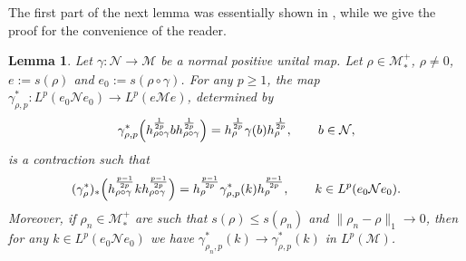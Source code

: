 \documentclass[12pt]{article}
\newtheorem{lemma}[theorem]{Lemma}
\theoremstyle{definition}
\theoremstyle{remark}
\numberwithin{equation}{section}
\def\Me{\mathcal M}
\def\Ne{\mathcal N}
\begin{document}
The first part of the next lemma was essentially shown in
\cite[Proposition 3.12]{jencova2018renyi}, while we give the proof for the convenience of the reader.

\begin{lemma}\label{lemma:pcontraction} Let $\gamma:\Ne\to \Me$ be a normal positive unital map.
Let $\rho\in \Me_*^+$, {$\rho\ne0$,} $e:=s(\rho)$ and $e_0:=s(\rho\circ\gamma)$. For any
$p\ge 1$, the map $\gamma^*_{\rho,p}:L^p(e_0 \Ne e_0)\to L^p(e\Me e)$, determined by
\begin{align}\label{gamma-rho-p1}
\gamma^*_{\rho,p}\Bigl(h_{\rho\circ\gamma}^{1\over 2p}bh^{1\over2p}_{\rho\circ\gamma}\Bigr)
=h_\rho^{1\over 2p}\gamma(b) h_\rho^{1\over 2p},\qquad b\in \Ne,
\end{align}
is a contraction such that 
\begin{align}\label{gamma-rho-p2}
(\gamma^*_\rho)_*\Bigl(h_{\rho\circ\gamma}^{p-1\over 2p}k
h_{\rho\circ\gamma}^{p-1\over2p}\Bigr)
=h_\rho^{p-1\over 2p}\gamma^*_{\rho,p}(k)h_\rho^{p-1\over 2p},\qquad
k\in L^p(e_0 \Ne e_0).
\end{align}
Moreover, if $\rho_n\in \Me_*^+$ are such that $s(\rho)\le s(\rho_n)$ and
$\|\rho_n-\rho\|_1\to 0$, then for any $k\in L^p(e_0 \Ne e_0)$ we have
$\gamma^*_{\rho_n,p}(k)\to \gamma^*_{\rho,p}(k)$ in $L^p(\Me)$.

\end{lemma}
\end{document}
